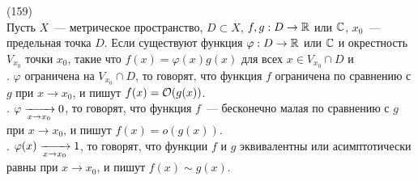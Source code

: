 (159)\\
Пусть $X$~--- метрическое пространство, $D \subset X$, $f, g: D \to \mathbb{R}$ или $\mathbb{C}$, $x_0$~--- предельная точка $D$. Если существуют функция $\varphi: D \to \mathbb{R}$ или $\mathbb{C}$ и окрестность $V_{x_0}$ точки $x_0$, такие что $f(x) = \varphi(x)g(x)$ для всех $x \in V_{x_0} \cap D$ и\\
. $\varphi$ ограничена на $V_{x_0} \cap D$, то говорят, что функция $f$ ограничена по сравнению с $g$ при $x \to x_0$, и пишут $f(x) = \mathcal{O}(g(x))$.\\
. $\varphi \xrightarrow[x\to x_0]{} 0$, то говорят, что функция $f$~--- бесконечно малая по сравнению с $g$ при $x \to x_0$, и пишут $f(x) = o(g(x))$.\\
. $\varphi(x) \xrightarrow[x\to x_0]{} 1$, то говорят, что функции $f$ и $g$ эквивалентны или асимптотически равны при $x \to x_0$, и пишут $f(x) \sim g(x)$.